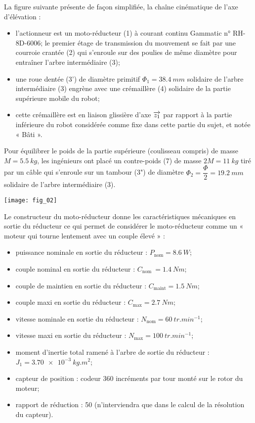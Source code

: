 \begin{multicols}{2}
La figure suivante présente de façon simplifiée, la chaîne cinématique de l’axe d’élévation :
\begin{itemize}
\item l’actionneur est un moto-réducteur (1) à courant continu Gammatic n° RH-8D-6006;
le premier étage de transmission du mouvement se fait par une courroie crantée (2) qui s’enroule sur des poulies de même diamètre pour entraîner l’arbre intermédiaire (3);
\item une roue dentée (3’) de diamètre primitif $\Phi_1 = \SI{38,4}{mm}$ solidaire de l’arbre intermédiaire (3) engrène avec une crémaillère (4) solidaire de la partie supérieure mobile du robot;
\item cette crémaillère est en liaison glissière d’axe $\overrightarrow{z_1}$ par rapport à la partie inférieure du robot considérée comme fixe dans cette partie du sujet, et notée « Bâti ».
\end{itemize}

Pour équilibrer le poids de la partie supérieure (coulisseau compris) de masse $M = \SI{5,5}{kg}$, les ingénieurs ont placé un contre-poids (7) de masse $2M = \SI{11}{kg}$ tiré par un câble qui s’enroule sur un tambour (3") de diamètre $\Phi_2 = \dfrac{\Phi}{2} = \SI{19,2}{mm}$ solidaire de  l’arbre intermédiaire (3).


\begin{center}
\texttt{[image: fig\_02]}
\end{center}



Le constructeur du moto-réducteur donne les caractéristiques mécaniques en sortie du réducteur  ce qui permet de considérer le moto-réducteur comme un « moteur qui tourne lentement avec un couple élevé » :
\begin{itemize}
\item puissance nominale en sortie du réducteur : $P_{\text{nom}} = \SI{8,6}{W}$;
\item couple nominal en sortie du réducteur : $C_{\text{nom }} = \SI{1,4}{Nm}$;  
\item couple de maintien en sortie du réducteur : $C_{\text{maint}} = \SI{1,5}{Nm}$;
\item couple maxi en sortie du réducteur : $C_{\text{max}}	= \SI{2,7}{Nm}$;
\item vitesse nominale en sortie du réducteur : $N_{\text{nom}} = \SI{60}{tr.min^{-1}}$;
\item vitesse maxi en sortie du réducteur : $N_{\text{max}} = \SI{100}{tr.min^{-1}}$;
\item moment d’inertie total ramené à l’arbre de sortie du réducteur : $J_1 = \SI{3,70e-3}{kg.m^2}$; 
\item capteur de position : codeur 360 incréments par tour monté sur le rotor du moteur;
\item rapport de réduction : 50 (n’interviendra que dans le calcul de la résolution du capteur).
\end{itemize}


\end{multicols}
